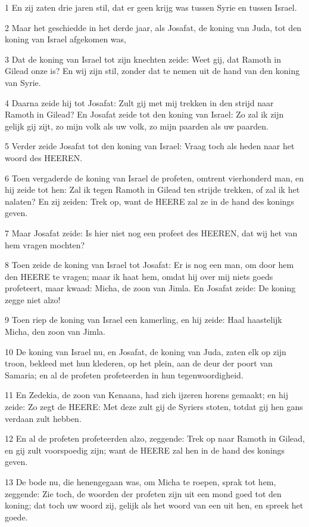 \par 1 En zij zaten drie jaren stil, dat er geen krijg was tussen Syrie en tussen Israel.
\par 2 Maar het geschiedde in het derde jaar, als Josafat, de koning van Juda, tot den koning van Israel afgekomen was,
\par 3 Dat de koning van Israel tot zijn knechten zeide: Weet gij, dat Ramoth in Gilead onze is? En wij zijn stil, zonder dat te nemen uit de hand van den koning van Syrie.
\par 4 Daarna zeide hij tot Josafat: Zult gij met mij trekken in den strijd naar Ramoth in Gilead? En Josafat zeide tot den koning van Israel: Zo zal ik zijn gelijk gij zijt, zo mijn volk als uw volk, zo mijn paarden als uw paarden.
\par 5 Verder zeide Josafat tot den koning van Israel: Vraag toch als heden naar het woord des HEEREN.
\par 6 Toen vergaderde de koning van Israel de profeten, omtrent vierhonderd man, en hij zeide tot hen: Zal ik tegen Ramoth in Gilead ten strijde trekken, of zal ik het nalaten? En zij zeiden: Trek op, want de HEERE zal ze in de hand des konings geven.
\par 7 Maar Josafat zeide: Is hier niet nog een profeet des HEEREN, dat wij het van hem vragen mochten?
\par 8 Toen zeide de koning van Israel tot Josafat: Er is nog een man, om door hem den HEERE te vragen; maar ik haat hem, omdat hij over mij niets goeds profeteert, maar kwaad: Micha, de zoon van Jimla. En Josafat zeide: De koning zegge niet alzo!
\par 9 Toen riep de koning van Israel een kamerling, en hij zeide: Haal haastelijk Micha, den zoon van Jimla.
\par 10 De koning van Israel nu, en Josafat, de koning van Juda, zaten elk op zijn troon, bekleed met hun klederen, op het plein, aan de deur der poort van Samaria; en al de profeten profeteerden in hun tegenwoordigheid.
\par 11 En Zedekia, de zoon van Kenaana, had zich ijzeren horens gemaakt; en hij zeide: Zo zegt de HEERE: Met deze zult gij de Syriers stoten, totdat gij hen gans verdaan zult hebben.
\par 12 En al de profeten profeteerden alzo, zeggende: Trek op naar Ramoth in Gilead, en gij zult voorspoedig zijn; want de HEERE zal hen in de hand des konings geven.
\par 13 De bode nu, die henengegaan was, om Micha te roepen, sprak tot hem, zeggende: Zie toch, de woorden der profeten zijn uit een mond goed tot den koning; dat toch uw woord zij, gelijk als het woord van een uit hen, en spreek het goede.
